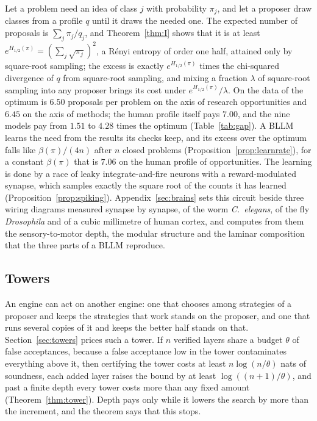 Let a problem need an idea of class $j$ with probability $\pi_{j}$, and let a proposer draw classes from a profile $q$ until it draws the needed one. The expected number of proposals is $\sum_{j}\pi_{j}/q_{j}$, and Theorem~\ref{thm:I} shows that it is at least $e^{H_{1/2}(\pi)}=(\sum_{j}\sqrt{\pi_{j}})^{2}$, a R\'enyi entropy of order one half, attained only by square-root sampling; the excess is exactly $e^{H_{1/2}(\pi)}$ times the chi-squared divergence of $q$ from square-root sampling, and mixing a fraction $\lambda$ of square-root sampling into any proposer brings its cost under $e^{H_{1/2}(\pi)}/\lambda$. On the data of \cite{CZC26} the optimum is $6.50$ proposals per problem on the axis of research opportunities and $6.45$ on the axis of methods; the human profile itself pays $7.00$, and the nine models pay from $1.51$ to $4.28$ times the optimum (Table~\ref{tab:gap}). A BLLM learns the need from the results its checks keep, and its excess over the optimum falls like $\beta(\pi)/(4n)$ after $n$ closed problems (Proposition~\ref{prop:learnrate}), for a constant $\beta(\pi)$ that is $7.06$ on the human profile of opportunities. The learning is done by a race of leaky integrate-and-fire neurons with a reward-modulated synapse, which samples exactly the square root of the counts it has learned (Proposition~\ref{prop:spiking}). Appendix~\ref{sec:brains} sets this circuit beside three wiring diagrams measured synapse by synapse, of the worm \textit{C.~elegans}, of the fly \textit{Drosophila} and of a cubic millimetre of human cortex, and computes from them the sensory-to-motor depth, the modular structure and the laminar composition that the three parts of a BLLM reproduce.

\subsection{Towers}

An engine can act on another engine: one that chooses among strategies of a proposer and keeps the strategies that work stands on the proposer, and one that runs several copies of it and keeps the better half stands on that. Section~\ref{sec:towers} prices such a tower. If $n$ verified layers share a budget $\theta$ of false acceptances, because a false acceptance low in the tower contaminates everything above it, then certifying the tower costs at least $n\log(n/\theta)$ nats of soundness, each added layer raises the bound by at least $\log((n+1)/\theta)$, and past a finite depth every tower costs more than any fixed amount (Theorem~\ref{thm:tower}). Depth pays only while it lowers the search by more than the increment, and the theorem says that this stops.

